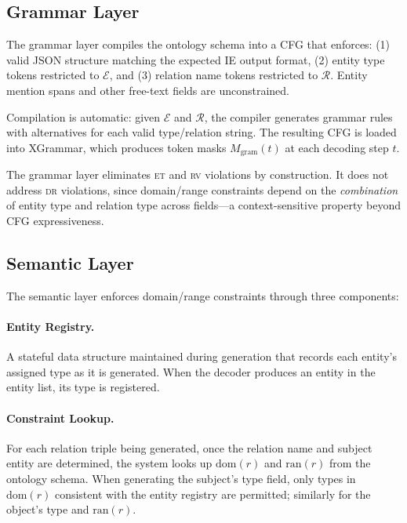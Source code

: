 \documentclass[11pt,a4paper]{article}
\newcommand{\DR}{\textsc{dr}}
\newcommand{\RV}{\textsc{rv}}
\newcommand{\ET}{\textsc{et}}
\begin{document}
\subsection{Grammar Layer}
\label{sec:grammar}

The grammar layer compiles the ontology schema into a CFG that enforces: (1) valid JSON structure matching the expected IE output format, (2) entity type tokens restricted to $\mathcal{E}$, and (3) relation name tokens restricted to $\mathcal{R}$. Entity mention spans and other free-text fields are unconstrained.

Compilation is automatic: given $\mathcal{E}$ and $\mathcal{R}$, the compiler generates grammar rules with alternatives for each valid type/relation string. The resulting CFG is loaded into XGrammar, which produces token masks $M_{\text{gram}}(t)$ at each decoding step $t$.

The grammar layer eliminates \ET{} and \RV{} violations by construction. It does not address \DR{} violations, since domain/range constraints depend on the \emph{combination} of entity type and relation type across fields---a context-sensitive property beyond CFG expressiveness.

\subsection{Semantic Layer}
\label{sec:semantic}

The semantic layer enforces domain/range constraints through three components:

\paragraph{Entity Registry.} A stateful data structure maintained during generation that records each entity's assigned type as it is generated. When the decoder produces an entity in the entity list, its type is registered.

\paragraph{Constraint Lookup.} For each relation triple being generated, once the relation name and subject entity are determined, the system looks up $\text{dom}(r)$ and $\text{ran}(r)$ from the ontology schema. When generating the subject's type field, only types in $\text{dom}(r)$ consistent with the entity registry are permitted; similarly for the object's type and $\text{ran}(r)$.
\end{document}
